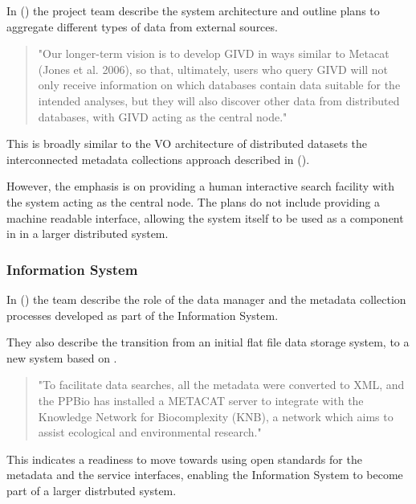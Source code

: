 \documentclass{article}
\begin{document}
In  (\cite{dengler-2011}) the \cite{gvid} project team describe the system
architecture and outline plans to aggregate different types of data from external sources.

\begin{quote}
"Our longer-term vision is to develop GIVD in ways similar to Metacat (Jones et
al. 2006), so that, ultimately, users who query GIVD will not only receive
information on which databases contain data suitable for the intended analyses,
but they will also discover other data from distributed databases, with GIVD
acting as the central node."
\end{quote}

This is broadly similar to the VO architecture of distributed datasets
the interconnected metadata collections approach described in
 (\cite{jones-2006}).

However, the emphasis is on providing a human interactive search facility
with the \cite{gvid} system acting as the central node.
The plans do not include providing a machine readable interface,
allowing the \cite{gvid} system itself to be used as a component in
in a larger distributed system.

\subsubsection{\cite{ppbio} Information System}

In  (\cite{pezzini-2012}) 
the \cite{ppbio} team describe the role of the data manager and the metadata
collection processes developed as part of the \cite{ppbio} Information System.

They also describe the transition from an initial flat file data storage system,
to a new system based on \cite{metacat}.

\begin{quote}
"To facilitate data searches, all the metadata were converted to XML,
and the PPBio has installed a METACAT server to integrate with the
Knowledge Network for Biocomplexity (KNB), a network which aims to
assist ecological and environmental research."
\end{quote}

This indicates a readiness to move towards using open standards for the
metadata and the service interfaces, enabling the
\cite{ppbio} Information System
to become part of a larger distrbuted system.

\subsubsection{}
\end{document}
